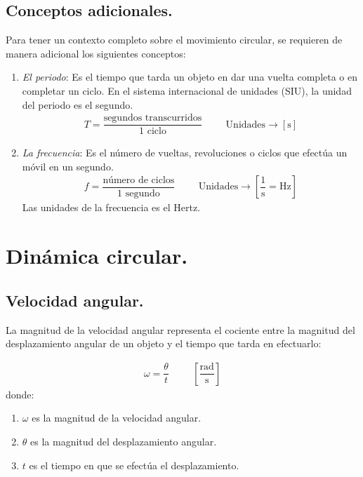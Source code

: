 \documentclass[14pt]{extarticle}
\begin{document}
\subsection{Conceptos adicionales.}

Para tener un contexto completo sobre el movimiento circular, se requieren de manera adicional los siguientes conceptos:
\begin{enumerate}
\item \textit{El periodo}: Es el tiempo que tarda un objeto en dar una vuelta completa o en completar un ciclo. En el sistema internacional de unidades (SIU), la unidad del periodo es el segundo.
\begin{align*}
T = \dfrac{\text{segundos transcurridos}}{\text{1 ciclo}} \hspace{1cm} \text{Unidades} \rightarrow \left[ \unit{\second} \right]
\end{align*}
\item \textit{La frecuencia}: Es el número de vueltas, revoluciones o ciclos que efectúa un móvil en un segundo.
\begin{align*}
f = \dfrac{\text{número de ciclos}}{\text{1 segundo}} \hspace{1cm} \text{Unidades} \rightarrow \left[ \dfrac{1}{\unit{\second}} = \si{\hertz} \right]
\end{align*}
Las unidades de la frecuencia es el Hertz.
\end{enumerate}
    
\section{Dinámica circular.}

\subsection{Velocidad angular.}

La magnitud de la velocidad angular representa el cociente entre la magnitud del desplazamiento angular de un objeto y el tiempo que tarda en efectuarlo:

\begin{align*}
\omega = \dfrac{\theta}{t} \hspace{1cm} \left[ \dfrac{\text{rad}}{\unit{\second}} \right]
\end{align*}
donde:
\begin{enumerate}[label=\alph*)]
\item $\omega$ es la magnitud de la velocidad angular.
\item $\theta$ es la magnitud del desplazamiento angular.
\item $t$ es el tiempo en que se efectúa el desplazamiento.
\end{enumerate}
\end{document}
